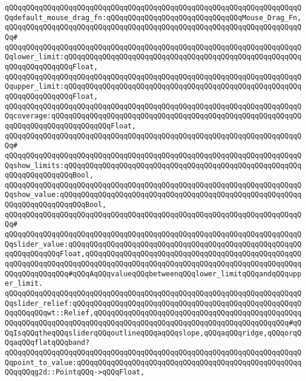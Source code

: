 \verb|qQQqqQQqqQQqqQQqqQQqqQQqqQQqqQQqqQQqqQQqqQQqqQQqqQQqqQQqqQQqqQQqqQQqqQQqdefault_mouse_drag_fn:qQQqqQQqqQQqqQQqqQQqqQQqqQQqqQQqMouse_Drag_Fn,|\newline
\verb|qQQqqQQqqQQqqQQqqQQqqQQqqQQqqQQqqQQqqQQqqQQqqQQqqQQqqQQqqQQqqQQqqQQqqQQq#|\newline
\verb|qQQqqQQqqQQqqQQqqQQqqQQqqQQqqQQqqQQqqQQqqQQqqQQqqQQqqQQqqQQqqQQqqQQqqQQqlower_limit:qQQqqQQqqQQqqQQqqQQqqQQqqQQqqQQqqQQqqQQqqQQqqQQqqQQqqQQqqQQqqQQqqQQqqQQqFloat,|\newline
\verb|qQQqqQQqqQQqqQQqqQQqqQQqqQQqqQQqqQQqqQQqqQQqqQQqqQQqqQQqqQQqqQQqqQQqqQQqupper_limit:qQQqqQQqqQQqqQQqqQQqqQQqqQQqqQQqqQQqqQQqqQQqqQQqqQQqqQQqqQQqqQQqqQQqqQQqFloat,|\newline
\verb|qQQqqQQqqQQqqQQqqQQqqQQqqQQqqQQqqQQqqQQqqQQqqQQqqQQqqQQqqQQqqQQqqQQqqQQqcoverage:qQQqqQQqqQQqqQQqqQQqqQQqqQQqqQQqqQQqqQQqqQQqqQQqqQQqqQQqqQQqqQQqqQQqqQQqqQQqqQQqqQQqFloat,|\newline
\verb|qQQqqQQqqQQqqQQqqQQqqQQqqQQqqQQqqQQqqQQqqQQqqQQqqQQqqQQqqQQqqQQqqQQqqQQq#|\newline
\verb|qQQqqQQqqQQqqQQqqQQqqQQqqQQqqQQqqQQqqQQqqQQqqQQqqQQqqQQqqQQqqQQqqQQqqQQqshow_limits:qQQqqQQqqQQqqQQqqQQqqQQqqQQqqQQqqQQqqQQqqQQqqQQqqQQqqQQqqQQqqQQqqQQqqQQqBool,|\newline
\verb|qQQqqQQqqQQqqQQqqQQqqQQqqQQqqQQqqQQqqQQqqQQqqQQqqQQqqQQqqQQqqQQqqQQqqQQqshow_value:qQQqqQQqqQQqqQQqqQQqqQQqqQQqqQQqqQQqqQQqqQQqqQQqqQQqqQQqqQQqqQQqqQQqqQQqqQQqBool,|\newline
\verb|qQQqqQQqqQQqqQQqqQQqqQQqqQQqqQQqqQQqqQQqqQQqqQQqqQQqqQQqqQQqqQQqqQQqqQQq#|\newline
\verb|qQQqqQQqqQQqqQQqqQQqqQQqqQQqqQQqqQQqqQQqqQQqqQQqqQQqqQQqqQQqqQQqqQQqqQQqslider_value:qQQqqQQqqQQqqQQqqQQqqQQqqQQqqQQqqQQqqQQqqQQqqQQqqQQqqQQqqQQqqQQqqQQqFloat,qQQqqQQqqQQqqQQqqQQqqQQqqQQqqQQqqQQqqQQqqQQqqQQqqQQqqQQqqQQqqQQqqQQqqQQqqQQqqQQqqQQqqQQqqQQqqQQqqQQqqQQqqQQqqQQqqQQqqQQqqQQqqQQqqQQqqQQq#qQQqAqQQqvalueqQQqbetweenqQQqlower_limitqQQqandqQQqupper_limit.|\newline
\verb|qQQqqQQqqQQqqQQqqQQqqQQqqQQqqQQqqQQqqQQqqQQqqQQqqQQqqQQqqQQqqQQqqQQqqQQqslider_relief:qQQqqQQqqQQqqQQqqQQqqQQqqQQqqQQqqQQqqQQqqQQqqQQqqQQqqQQqqQQqqQQqwt::Relief,qQQqqQQqqQQqqQQqqQQqqQQqqQQqqQQqqQQqqQQqqQQqqQQqqQQqqQQqqQQqqQQqqQQqqQQqqQQqqQQqqQQqqQQqqQQqqQQqqQQqqQQqqQQqqQQqqQQq#qQQqIsqQQqtheqQQqsliderqQQqoutlineqQQqaqQQqslope,qQQqaqQQqridge,qQQqorqQQqaqQQqflatqQQqband?|\newline
\verb|qQQqqQQqqQQqqQQqqQQqqQQqqQQqqQQqqQQqqQQqqQQqqQQqqQQqqQQqqQQqqQQqqQQqqQQqpoint_to_value:qQQqqQQqqQQqqQQqqQQqqQQqqQQqqQQqqQQqqQQqqQQqqQQqqQQqqQQqqQQqg2d::PointqQQq->qQQqFloat,|\newline
